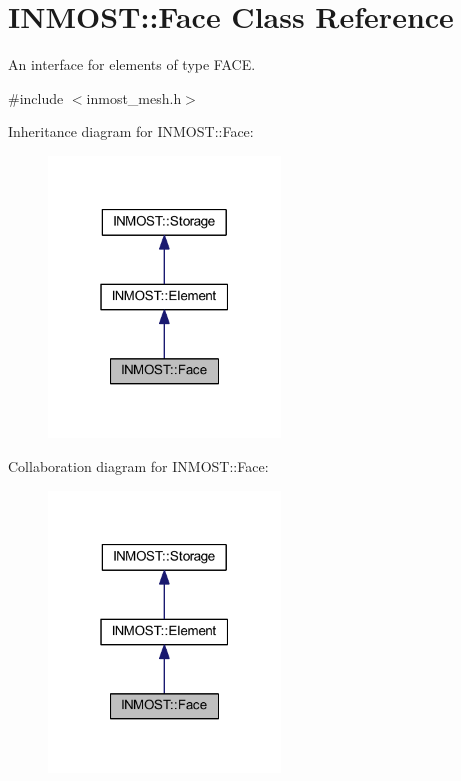 \hypertarget{classINMOST_1_1Face}{\section{I\-N\-M\-O\-S\-T\-:\-:Face Class Reference}
\label{classINMOST_1_1Face}
}


An interface for elements of type F\-A\-C\-E.  




{\ttfamily \#include $<$inmost\-\_\-mesh.\-h$>$}



Inheritance diagram for I\-N\-M\-O\-S\-T\-:\-:Face\-:\nopagebreak
\begin{figure}[H]
\begin{center}
\leavevmode
\includegraphics[width=175pt]{classINMOST_1_1Face__inherit__graph}
\end{center}
\end{figure}


Collaboration diagram for I\-N\-M\-O\-S\-T\-:\-:Face\-:\nopagebreak
\begin{figure}[H]
\begin{center}
\leavevmode
\includegraphics[width=175pt]{classINMOST_1_1Face__coll__graph}
\end{center}
\end{figure}
